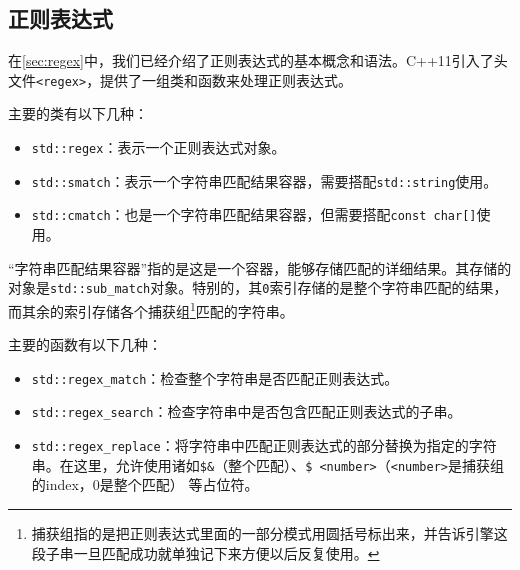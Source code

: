 \subsection{正则表达式}

在\ref{sec:regex}中，我们已经介绍了正则表达式的基本概念和语法。C++11引入了头文件\texttt{<regex>}，提供了一组类和函数来处理正则表达式。

主要的类有以下几种：
\begin{itemize}
  \item \texttt{std::regex}：表示一个正则表达式对象。
  \item \texttt{std::smatch}：表示一个字符串匹配结果容器，需要搭配\texttt{std::string}使用。
  \item \texttt{std::cmatch}：也是一个字符串匹配结果容器，但需要搭配\texttt{const char[]}使用。
\end{itemize}
“字符串匹配结果容器”指的是这是一个容器，能够存储匹配的详细结果。其存储的对象是\texttt{std::sub\_match}对象。特别的，其\texttt{0}索引存储的是整个字符串匹配的结果，而其余的索引存储各个捕获组\footnote{捕获组指的是把正则表达式里面的一部分模式用圆括号标出来，并告诉引擎这段子串一旦匹配成功就单独记下来方便以后反复使用。}匹配的字符串。

主要的函数有以下几种：
\begin{itemize}
  \item \texttt{std::regex\_match}：检查整个字符串是否匹配正则表达式。
  \item \texttt{std::regex\_search}：检查字符串中是否包含匹配正则表达式的子串。
  \item \texttt{std::regex\_replace}：将字符串中匹配正则表达式的部分替换为指定的字符串。在这里，允许使用诸如\texttt{\$\&}（整个匹配）、\texttt{\$ <number>}（\texttt{<number>}是捕获组的index，0是整个匹配）
  等占位符。
\end{itemize}

